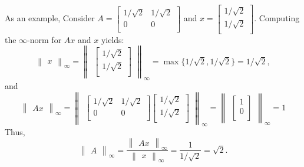 \documentclass{article}
\begin{document}
As an example, Consider 
$A = 
\begin{bmatrix}
    1/\sqrt{2} & 1/\sqrt{2}\\
    0 & 0\\
\end{bmatrix} $
 and
 $x = \begin{bmatrix}
    1/\sqrt{2}\\
    1/\sqrt{2}\\
 \end{bmatrix}$. Computing the $\infty$-norm for $Ax$ and $x$ yields:
 \[ 
    \begin{Vmatrix}
        x
    \end{Vmatrix}_\infty
    =
    \begin{Vmatrix}
        \begin{bmatrix}
            1/\sqrt{2}\\
            1/\sqrt{2}\\
        \end{bmatrix}
    \end{Vmatrix}_\infty
    = \max \{1/\sqrt{2}, 1/\sqrt{2}\}
    = 1/\sqrt{2},
 \]
 and
 \[
    \begin{Vmatrix}
        Ax
    \end{Vmatrix}_\infty
    =
    \begin{Vmatrix}
        \begin{bmatrix}
            1/\sqrt{2} & 1/\sqrt{2}\\
            0 & 0\\
        \end{bmatrix}
        \begin{bmatrix}
            1/\sqrt{2}\\
            1/\sqrt{2}\\
        \end{bmatrix}
    \end{Vmatrix}_\infty
    =
    \begin{Vmatrix}
        \begin{bmatrix}
            1\\
            0\\
        \end{bmatrix}
    \end{Vmatrix}_\infty
    =
    1
 \]
 Thus, 
 \[
    \begin{Vmatrix}
        A
    \end{Vmatrix}_\infty
    =
    \frac{
            \begin{Vmatrix}
                Ax
            \end{Vmatrix}_{\infty}
        }{
            \begin{Vmatrix}
                x
            \end{Vmatrix}_{\infty}
        } 
    =
    \frac{1}{1/\sqrt{2}} = \sqrt{2}.
\]
\end{document}
